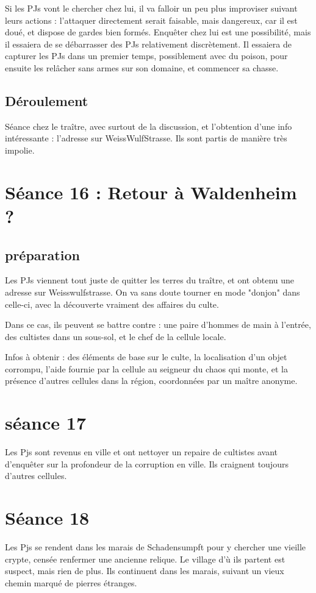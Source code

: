 \documentclass[10pt,a4paper]{book}
\begin{document}
Si les PJs vont le chercher chez lui, il va falloir un peu plus improviser suivant leurs actions : l'attaquer directement serait faisable, mais dangereux, car il est doué, et dispose de gardes bien formés. Enquêter chez lui est une possibilité, mais il essaiera de se débarrasser des PJs relativement discrètement. Il essaiera de capturer les PJs dans un premier temps, possiblement avec du poison, pour ensuite les relâcher sans armes sur son domaine, et commencer sa chasse.
\subsection{Déroulement}
Séance chez le traître, avec surtout de la discussion, et l'obtention d'une info intéressante : l'adresse sur WeissWulfStrasse. Ils sont partis de manière très impolie.
\section{Séance 16 : Retour à Waldenheim ?}
\subsection{préparation}
Les PJs viennent tout juste de quitter les terres du traître, et ont obtenu une adresse sur Weisswulfstrasse. On va sans doute tourner en mode "donjon" dans celle-ci, avec la découverte vraiment des affaires du culte.

Dans ce cas, ils peuvent se battre contre : une paire d'hommes de main à l'entrée, des cultistes dans un sous-sol, et le chef de la cellule locale.

Infos à obtenir : des éléments de base sur le culte, la localisation d'un objet corrompu, l'aide fournie par la cellule au seigneur du chaos qui monte, et la présence d'autres cellules dans la région, coordonnées par un maître anonyme.
\section{séance 17}
Les Pjs sont revenus en ville et ont nettoyer un repaire de cultistes avant d'enquêter sur la profondeur de la corruption en ville. Ils craignent toujours d'autres cellules.
\section{Séance 18}
Les Pjs se rendent dans les marais de Schadensumpft pour y chercher une vieille crypte, censée renfermer une ancienne relique.
Le village d'ù ils partent est suspect, mais rien de plus.
Ils continuent dans les marais, suivant un vieux chemin marqué de pierres étranges.
\end{document}
